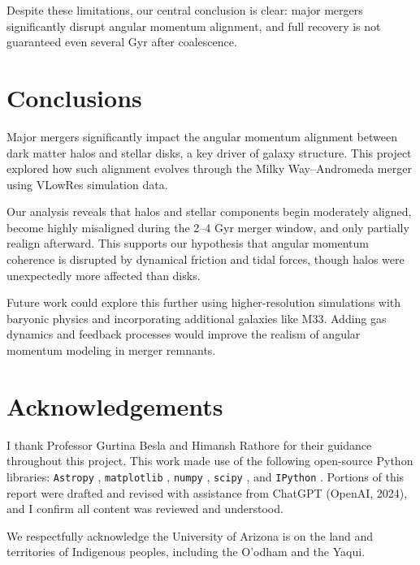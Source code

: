 \documentclass[twocolumn]{aastex631}
\begin{document}
Despite these limitations, our central conclusion is clear: major mergers significantly disrupt angular momentum alignment, and full recovery is not guaranteed even several Gyr after coalescence.

\section{Conclusions}
Major mergers significantly impact the angular momentum alignment between dark matter halos and stellar disks, a key driver of galaxy structure. This project explored how such alignment evolves through the Milky Way–Andromeda merger using VLowRes simulation data. 

Our analysis reveals that halos and stellar components begin moderately aligned, become highly misaligned during the 2–4 Gyr merger window, and only partially realign afterward. This supports our hypothesis that angular momentum coherence is disrupted by dynamical friction and tidal forces, though halos were unexpectedly more affected than disks.

Future work could explore this further using higher-resolution simulations with baryonic physics and incorporating additional galaxies like M33. Adding gas dynamics and feedback processes would improve the realism of angular momentum modeling in merger remnants.

\section*{Acknowledgements}
I thank Professor Gurtina Besla and Himansh Rathore for their guidance throughout this project. This work made use of the following open-source Python libraries: \texttt{Astropy} \citep{astropy2013,astropy2018}, \texttt{matplotlib} \citep{hunter2007}, \texttt{numpy} \citep{vanderwalt2011}, \texttt{scipy} \citep{jones2001}, and \texttt{IPython} \citep{perez2007}. Portions of this report were drafted and revised with assistance from ChatGPT (OpenAI, 2024), and I confirm all content was reviewed and understood.

We respectfully acknowledge the University of Arizona is on the land and territories of Indigenous peoples, including the O’odham and the Yaqui.



\end{document}
